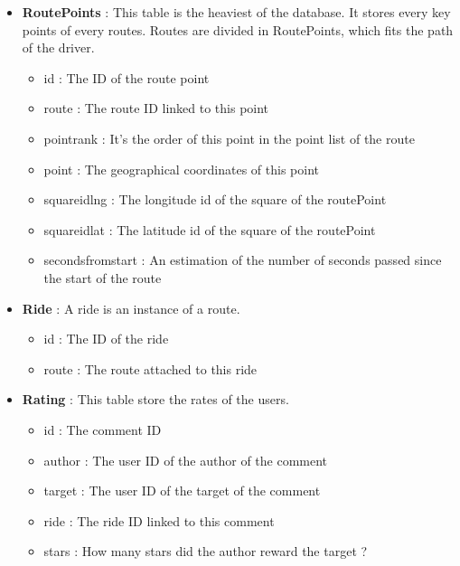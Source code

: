 \begin{itemize}
\begin{itemize}
    	\item route : The route ID linked to this meta
    	\item route\textunderscore date : First date of the repeat. It's assumed to be every week starting from this day
    	\item weekly\textunderscore repeat : Is this route must be repeated every week ?
    \end{itemize}
    \item \textbf{RoutePoints} : This table is the heaviest of the database. It stores every key points of every routes. Routes are divided in RoutePoints, which fits the path of the driver.
    \begin{itemize}
    	\item id : The ID of the route point
    	\item route : The route ID linked to this point
    	\item point\textunderscore rank : It's the order of this point in the point list of the route
    	\item point : The geographical coordinates of this point
    	\item square\textunderscore id\textunderscore lng : The longitude id of the square of the routePoint
    	\item square\textunderscore id\textunderscore lat : The latitude id of the square of the routePoint
    	\item seconds\textunderscore from\textunderscore start : An estimation of the number of seconds passed since the start of the route
    \end{itemize}
    \item \textbf{Ride} : A ride is an instance of a route.
    \begin{itemize}
    	\item id : The ID of the ride
    	\item route : The route attached to this ride
    \end{itemize}
    \item \textbf{Rating} : This table store the rates of the users.
    \begin{itemize}
    	\item id : The comment ID
    	\item author : The user ID of the author of the comment
    	\item target : The user ID of the target of the comment
    	\item ride : The ride ID linked to this comment
    	\item stars : How many stars did the author reward the target ?

\end{itemize}
\end{itemize}
